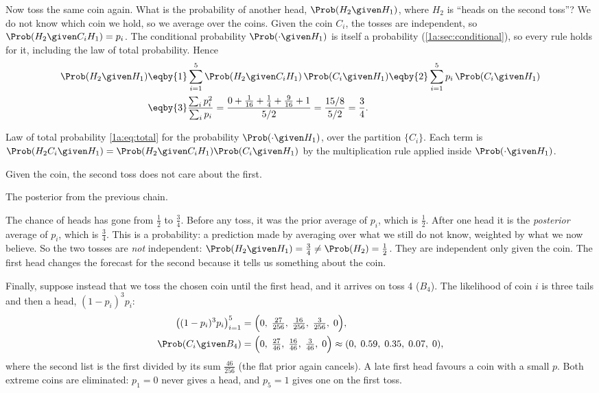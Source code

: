 Now toss the same coin again. What is the probability of another head,
$\Prob(H_2\given H_1)$, where $H_2$ is ``heads on the second toss''? We do not
know which coin we hold, so we average over the coins. Given the coin $C_i$,
the tosses are independent, so $\Prob(H_2\given C_iH_1)=p_i$. The conditional
probability $\Prob(\cdot\given H_1)$ is itself a probability
(\cref{1a:sec:conditional}), so every rule holds for it, including the law of
total probability. Hence
\begin{align*}
\Prob(H_2\given H_1)
&\eqby{1}\sum_{i=1}^5\Prob(H_2\given C_iH_1)\,\Prob(C_i\given H_1)
 \eqby{2}\sum_{i=1}^5p_i\,\Prob(C_i\given H_1)\\
&\eqby{3}\frac{\sum_ip_i^2}{\sum_ip_i}
 =\frac{0+\tfrac1{16}+\tfrac14+\tfrac9{16}+1}{5/2}=\frac{15/8}{5/2}=\frac34 .
\end{align*}
\begin{explain}
  \item Law of total probability \eqref{1a:eq:total} for the probability
        $\Prob(\cdot\given H_1)$, over the partition $\{C_i\}$. Each term is
        $\Prob(H_2C_i\given H_1)=\Prob(H_2\given C_iH_1)\Prob(C_i\given H_1)$ by the
        multiplication rule applied inside $\Prob(\cdot\given H_1)$.
  \item Given the coin, the second toss does not care about the first.
  \item The posterior from the previous chain.
\end{explain}
The chance of heads has gone from $\tfrac12$ to $\tfrac34$. Before any toss, it
was the prior average of $p_i$, which is $\tfrac12$. After one head it is the
\emph{posterior} average of $p_i$, which is $\tfrac34$. This is a
 probability: a prediction made by averaging over
what we still do not know, weighted by what we now believe. So the two tosses
are \emph{not} independent: $\Prob(H_2\given H_1)=\tfrac34\neq\Prob(H_2)=\tfrac12$.
They are independent only given the coin. The first head changes the forecast
for the second because it tells us something about the coin.

Finally, suppose instead that we toss the chosen coin until the first head,
and it arrives on toss 4 ($B_4$). The likelihood of coin $i$ is three tails and
then a head, $(1-p_i)^3p_i$:
\begin{align*}
\bigl((1-p_i)^3p_i\bigr)_{i=1}^5&=\Bigl(0,\;\tfrac{27}{256},\;\tfrac{16}{256},\;\tfrac{3}{256},\;0\Bigr),\\
\Prob(C_i\given B_4)&=\Bigl(0,\;\tfrac{27}{46},\;\tfrac{16}{46},\;\tfrac{3}{46},\;0\Bigr)
\approx(0,\;0.59,\;0.35,\;0.07,\;0),
\end{align*}
where the second list is the first divided by its sum $\tfrac{46}{256}$ (the flat
prior again cancels). A late first head favours a coin with a small $p$. Both
extreme coins are eliminated: $p_1=0$ never gives a head, and $p_5=1$ gives one
on the first toss.

